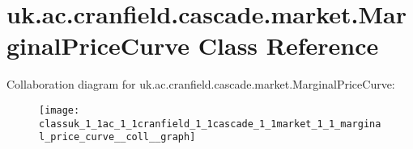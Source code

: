 \hypertarget{classuk_1_1ac_1_1cranfield_1_1cascade_1_1market_1_1_marginal_price_curve}{\section{uk.\-ac.\-cranfield.\-cascade.\-market.\-Marginal\-Price\-Curve Class Reference}
\label{classuk_1_1ac_1_1cranfield_1_1cascade_1_1market_1_1_marginal_price_curve}
}


Collaboration diagram for uk.\-ac.\-cranfield.\-cascade.\-market.\-Marginal\-Price\-Curve\-:\nopagebreak
\begin{figure}[H]
\begin{center}
\leavevmode
\texttt{[image: classuk\_1\_1ac\_1\_1cranfield\_1\_1cascade\_1\_1market\_1\_1\_marginal\_price\_curve\_\_coll\_\_graph]}
\end{center}
\end{figure}
